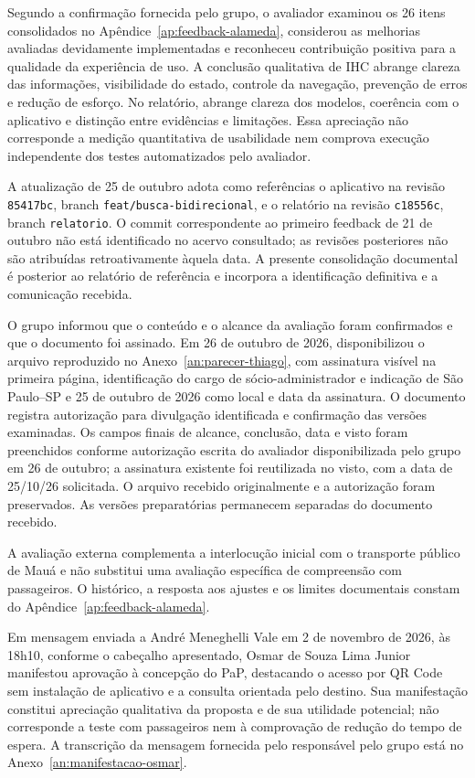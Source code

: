\documentclass[12pt,oneside,a4paper,brazil,chapter=TITLE]{abntex2}
\begin{document}
Segundo a confirmação fornecida pelo grupo, o avaliador examinou os 26 itens consolidados no Apêndice~\ref{ap:feedback-alameda}, considerou as melhorias avaliadas devidamente implementadas e reconheceu contribuição positiva para a qualidade da experiência de uso. A conclusão qualitativa de IHC abrange clareza das informações, visibilidade do estado, controle da navegação, prevenção de erros e redução de esforço. No relatório, abrange clareza dos modelos, coerência com o aplicativo e distinção entre evidências e limitações. Essa apreciação não corresponde a medição quantitativa de usabilidade nem comprova execução independente dos testes automatizados pelo avaliador.

A atualização de 25 de outubro adota como referências o aplicativo na revisão \texttt{85417bc}, branch \texttt{feat/busca-bidirecional}, e o relatório na revisão \texttt{c18556c}, branch \texttt{relatorio}. O commit correspondente ao primeiro feedback de 21 de outubro não está identificado no acervo consultado; as revisões posteriores não são atribuídas retroativamente àquela data. A presente consolidação documental é posterior ao relatório de referência e incorpora a identificação definitiva e a comunicação recebida.

O grupo informou que o conteúdo e o alcance da avaliação foram confirmados e que o documento foi assinado. Em 26 de outubro de 2026, disponibilizou o arquivo reproduzido no Anexo~\ref{an:parecer-thiago}, com assinatura visível na primeira página, identificação do cargo de sócio-administrador e indicação de São Paulo--SP e 25 de outubro de 2026 como local e data da assinatura. O documento registra autorização para divulgação identificada e confirmação das versões examinadas. Os campos finais de alcance, conclusão, data e visto foram preenchidos conforme autorização escrita do avaliador disponibilizada pelo grupo em 26 de outubro; a assinatura existente foi reutilizada no visto, com a data de 25/10/26 solicitada. O arquivo recebido originalmente e a autorização foram preservados. As versões preparatórias permanecem separadas do documento recebido.

A avaliação externa complementa a interlocução inicial com o transporte público de Mauá e não substitui uma avaliação específica de compreensão com passageiros. O histórico, a resposta aos ajustes e os limites documentais constam do Apêndice~\ref{ap:feedback-alameda}.\par\endgroup

Em mensagem enviada a André Meneghelli Vale em 2 de novembro de 2026, às 18h10, conforme o cabeçalho apresentado, Osmar de Souza Lima Junior manifestou aprovação à concepção do PaP, destacando o acesso por QR Code sem instalação de aplicativo e a consulta orientada pelo destino. Sua manifestação constitui apreciação qualitativa da proposta e de sua utilidade potencial; não corresponde a teste com passageiros nem à comprovação de redução do tempo de espera. A transcrição da mensagem fornecida pelo responsável pelo grupo está no Anexo~\ref{an:manifestacao-osmar}.
\end{document}
